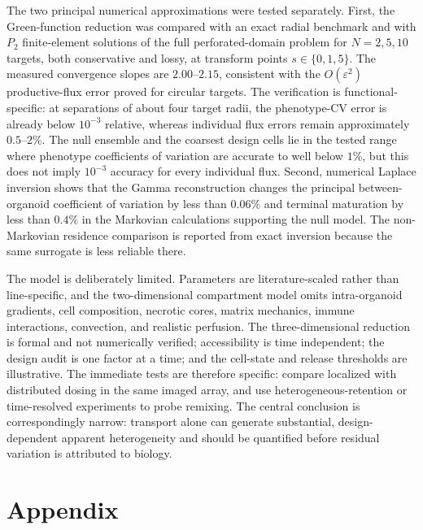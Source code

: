 \documentclass[pdflatex,sn-mathphys-num]{sn-jnl}
\numberwithin{equation}{section}
\theoremstyle{thmstyleone}%
\theoremstyle{definition}
\theoremstyle{remark}
\begin{document}
The two principal numerical approximations were tested separately. First, the Green-function reduction was compared with an exact radial benchmark and with $P_2$ finite-element solutions of the full perforated-domain problem for $N=2,5,10$ targets, both conservative and lossy, at transform points $s\in\{0,1,5\}$. The measured convergence slopes are $2.00$--$2.15$, consistent with the $O(\varepsilon^2)$ productive-flux error proved for circular targets. The verification is functional-specific: at separations of about four target
radii, the phenotype-CV error is already below $10^{-3}$ relative, whereas individual flux errors remain approximately $0.5$--$2\%$. The null ensemble and the coarsest design cells lie in the tested range where phenotype coefficients of variation are accurate to well below $1\%$, but this does not imply $10^{-3}$ accuracy for every individual flux. Second, numerical Laplace inversion shows that the Gamma reconstruction changes the principal between-organoid coefficient of variation by less than $0.06\%$ and terminal maturation by less than $0.4\%$ in the Markovian calculations supporting the null model. The non-Markovian residence comparison is reported from exact inversion because the same surrogate is less reliable there.

The model is deliberately limited. Parameters are literature-scaled rather
than line-specific, and the two-dimensional compartment model omits
intra-organoid gradients, cell composition, necrotic cores, matrix mechanics,
immune interactions, convection, and realistic perfusion. The three-dimensional
reduction is formal and not numerically verified; accessibility is
time independent; the design audit is one factor at a time; and the cell-state
and release thresholds are illustrative. The immediate tests are therefore
specific: compare localized with distributed dosing in the same imaged array,
and use heterogeneous-retention or time-resolved experiments to probe remixing.
The central conclusion is correspondingly narrow: transport alone can generate
substantial, design-dependent apparent heterogeneity and should be quantified
before residual variation is attributed to biology.

\section*{Appendix}
\end{document}
